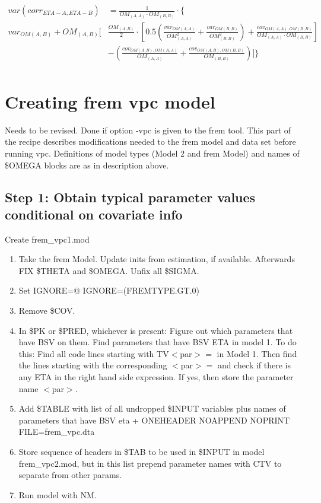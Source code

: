\[
\begin{split}
var\left(corr_{ETA-A,ETA-B}\right)&=\frac{1}{OM_{(A,A)}\cdot OM_{(B,B)}}\cdot \{\\
 var_{OM(A,B)} + OM_{(A,B)} [ & \frac{OM_{(A,B)}}{2}\cdot
\left[0.5 \left ( \frac{var_{OM(A,A)}}{OM_{(A,A)}^{2}}  +\frac{var_{OM(B,B)}}{OM_{(B,B)}^{2}}    \right) +  \frac{cov_{OM(A,A),OM(B,B)}}{OM_{(A,A)} \cdot OM_{(B,B)}} \right]\\
& - \left(\frac{cov_{OM(A,B),OM(A,A)}}{OM_{(A,A)}}+ \frac{cov_{OM(A,B),OM(B,B)}}{OM_{(B,B)}} \right)]\}\\
\end{split}
\]


\section{Creating frem vpc model}
Needs to be revised.
Done if option -vpc is given to the frem tool. This part of the recipe describes modifications needed to the frem model and data set before running vpc. Definitions of model types (Model 2 and frem Model) and names of \$OMEGA blocks are as in description above.

\subsection{Step 1: Obtain typical parameter values conditional on covariate info}
Create frem\_vpc1.mod

\begin{enumerate}
	\item Take the frem Model. Update inits from estimation, if available. Afterwards FIX \$THETA and \$OMEGA. Unfix all \$SIGMA.
	\item Set IGNORE=@ IGNORE=(FREMTYPE.GT.0)
	\item Remove \$COV.
	\item In \$PK or \$PRED, whichever is present:
Figure out which parameters that have BSV %
on them.
Find parameters
that have BSV ETA %
in model 1.
To do this: Find all code lines starting with TV$<$par$>=$ in Model 1. Then find the lines starting with the corresponding $<$par$>=$ and
check if there is any ETA in the right hand side expression. If yes, then store the parameter name $<$par$>$.
	\item Add \$TABLE with list of all undropped \$INPUT variables plus names of parameters that have BSV eta  + ONEHEADER NOAPPEND NOPRINT FILE=frem\_vpc.dta
	\item Store sequence of headers in \$TAB to be used in \$INPUT in model frem\_vpc2.mod, but in this list prepend parameter names with CTV to separate from other params.
	\item Run model with NM.
\end{enumerate}


